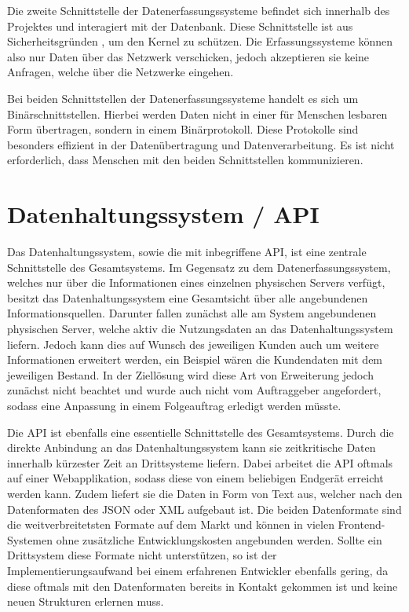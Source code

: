 Die zweite Schnittstelle der Datenerfassungssysteme befindet sich innerhalb des
Projektes und interagiert mit der Datenbank. Diese Schnittstelle ist aus
Sicherheitsgründen , um den Kernel zu
schützen. Die Erfassungssysteme können also nur Daten über das Netzwerk
verschicken, jedoch akzeptieren sie keine Anfragen, welche über die Netzwerke
eingehen.

Bei beiden Schnittstellen der Datenerfassungssysteme handelt es sich um
Binärschnittstellen. Hierbei werden Daten nicht in einer für Menschen lesbaren
Form übertragen, sondern in einem Binärprotokoll. Diese Protokolle sind
besonders effizient in der Datenübertragung und Datenverarbeitung. Es ist nicht
erforderlich, dass Menschen mit den beiden Schnittstellen kommunizieren.
\tm%

\section{Datenhaltungssystem / API}
Das Datenhaltungssystem, sowie die mit inbegriffene API, ist eine zentrale
Schnittstelle des Gesamtsystems. Im Gegensatz zu dem Datenerfassungssystem,
welches nur über die Informationen eines einzelnen physischen Servers verfügt,
besitzt das Datenhaltungssystem eine Gesamtsicht über alle angebundenen
Informationsquellen. Darunter fallen zunächst alle am System angebundenen
physischen Server, welche aktiv die Nutzungsdaten an das Datenhaltungssystem
liefern. Jedoch kann dies auf Wunsch des jeweiligen Kunden auch um weitere
Informationen erweitert werden, ein Beispiel wären die Kundendaten mit dem
jeweiligen Bestand. In der Ziellösung wird diese Art von Erweiterung jedoch
zunächst nicht beachtet und wurde auch nicht vom Auftraggeber angefordert,
sodass eine Anpassung in einem Folgeauftrag erledigt werden müsste.

Die API ist ebenfalls eine essentielle Schnittstelle des Gesamtsystems. Durch
die direkte Anbindung an das Datenhaltungssystem kann sie zeitkritische Daten
innerhalb kürzester Zeit an Drittsysteme liefern. Dabei arbeitet die API
oftmals auf einer Webapplikation, sodass diese von einem beliebigen Endgerät
erreicht werden kann. Zudem liefert sie die Daten in Form von Text aus, welcher
nach den Datenformaten des \gls{JSON} oder \gls{XML} aufgebaut ist. Die beiden
Datenformate sind die weitverbreitetsten Formate auf dem Markt und können in
vielen Frontend-Systemen ohne zusätzliche Entwicklungskosten angebunden
werden. Sollte ein Drittsystem diese Formate nicht unterstützen, so ist der
Implementierungsaufwand bei einem erfahrenen Entwickler ebenfalls gering, da
diese oftmals mit den Datenformaten bereits in Kontakt gekommen ist und keine
neuen Strukturen erlernen muss.
\nl%

